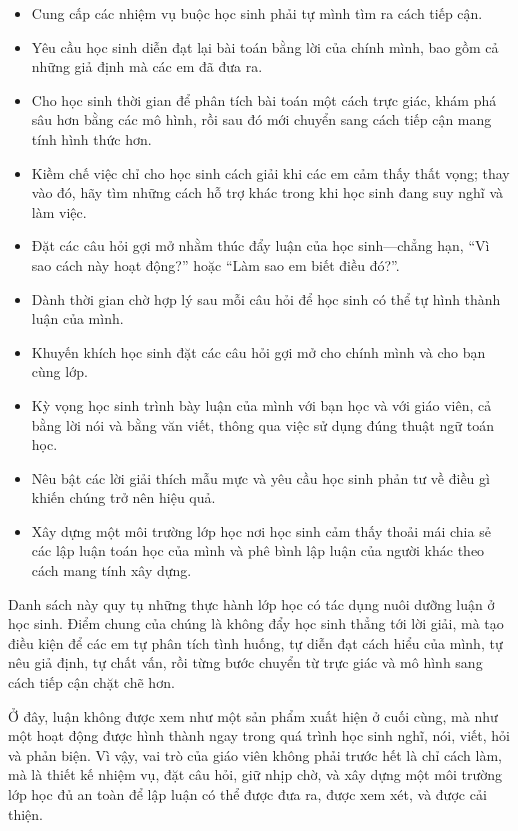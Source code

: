 \documentclass[
  10pt,
  a4paper,
  landscape,
  twoside,
  openany
]{scrbook}
\newcommand{\VI}[1]{#1}
\newcommand{\NOTE}[1]{#1}
\begin{document}
{
\VI{
  \begin{itemize}
    \item Cung cấp các nhiệm vụ buộc học sinh phải tự mình tìm ra cách tiếp cận.
    \item Yêu cầu học sinh diễn đạt lại bài toán bằng lời của chính mình, bao gồm cả những giả định mà các em đã đưa ra.
    \item Cho học sinh thời gian để phân tích bài toán một cách trực giác, khám phá sâu hơn bằng các mô hình, rồi sau đó mới chuyển sang cách tiếp cận mang tính hình thức hơn.
    \item Kiềm chế việc chỉ cho học sinh cách giải khi các em cảm thấy thất vọng; thay vào đó, hãy tìm những cách hỗ trợ khác trong khi học sinh đang suy nghĩ và làm việc.
    \item Đặt các câu hỏi gợi mở nhằm thúc đẩy luận của học sinh---chẳng hạn, ``Vì sao cách này hoạt động?” hoặc “Làm sao em biết điều đó?''.
    \item Dành thời gian chờ hợp lý sau mỗi câu hỏi để học sinh có thể tự hình thành luận của mình.
    \item Khuyến khích học sinh đặt các câu hỏi gợi mở cho chính mình và cho bạn cùng lớp.
    \item Kỳ vọng học sinh trình bày luận của mình với bạn học và với giáo viên, cả bằng lời nói và bằng văn viết, thông qua việc sử dụng đúng thuật ngữ toán học.
    \item Nêu bật các lời giải thích mẫu mực và yêu cầu học sinh phản tư về điều gì khiến chúng trở nên hiệu quả.
    \item Xây dựng một môi trường lớp học nơi học sinh cảm thấy thoải mái chia sẻ các lập luận toán học của mình và phê bình lập luận của người khác theo cách mang tính xây dựng.
  \end{itemize}
}
}
{
\NOTE{Danh sách này quy tụ những thực hành lớp học có tác dụng nuôi dưỡng luận ở học sinh. Điểm chung của chúng là không đẩy học sinh thẳng tới lời giải, mà tạo điều kiện để các em tự phân tích tình huống, tự diễn đạt cách hiểu của mình, tự nêu giả định, tự chất vấn, rồi từng bước chuyển từ trực giác và mô hình sang cách tiếp cận chặt chẽ hơn.

Ở đây, luận không được xem như một sản phẩm xuất hiện ở cuối cùng, mà như một hoạt động được hình thành ngay trong quá trình học sinh nghĩ, nói, viết, hỏi và phản biện. Vì vậy, vai trò của giáo viên không phải trước hết là chỉ cách làm, mà là thiết kế nhiệm vụ, đặt câu hỏi, giữ nhịp chờ, và xây dựng một môi trường lớp học đủ an toàn để lập luận có thể được đưa ra, được xem xét, và được cải thiện.}
}
\end{document}
